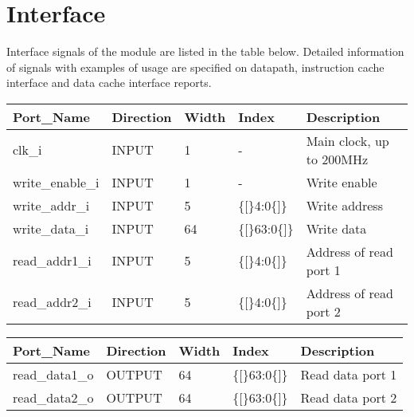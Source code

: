 \section{Interface}
\label{chapter 4}

Interface signals of the module are listed in the table below. Detailed information of signals with examples of usage are specified on datapath, instruction cache interface and data cache interface reports.

\begin{table}[H]
	\centering
	\begin{tabular}{lllll}
		\hline
		Port\_Name                      & Direction & Width & Index      & Description \\
		\hline
		clk\_i                          & INPUT     & 1     & -          & Main clock, up to 200MHz      \\
		write\_enable\_i                & INPUT     & 1     & -          & Write enable\\
		write\_addr\_i                  & INPUT     & 5     & \{[\}4:0\{]\} & Write address\\
		write\_data\_i                  & INPUT     & 64     & \{[\}63:0\{]\} & Write data \\
	    read\_addr1\_i                  & INPUT     & 5     & \{[\}4:0\{]\} & Address of read port 1 \\
	    read\_addr2\_i                  & INPUT     & 5     & \{[\}4:0\{]\} & Address of read port 2 \\
	\end{tabular}
\end{table}
		\begin{table}[H]
			\centering
			\begin{tabular}{lllll}
				\hline
				Port\_Name                      & Direction & Width & Index      & Description \\
				\hline
		read\_data1\_o                   & OUTPUT    & 64    & \{[\}63:0\{]\} & Read data port 1\\
		read\_data2\_o                   & OUTPUT    & 64    & \{[\}63:0\{]\} & Read data port 2\\

	\end{tabular}
\end{table}